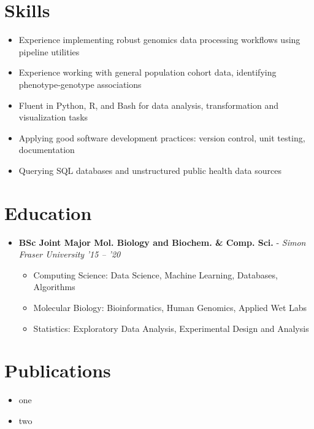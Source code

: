 \documentclass{article}
\newcommand{\experienceheader}[3]{\item \textbf{#1} - \textit{#2} \hfill \textit{#3} \vspace{-.2em}}
\newcommand{\customsection}[1]{\section*{#1} \vspace{-1em} \hrulefill \vspace{-.5em}}
\begin{document}
\customsection{Skills}
\begin{itemize}
  \item Experience implementing robust genomics data processing workflows using pipeline utilities
  \item Experience working with general population cohort data, identifying phenotype-genotype associations
  \item Fluent in Python, R, and Bash for data analysis, transformation and visualization tasks
  \item Applying good software development practices: version control, unit testing, documentation
  \item Querying SQL databases and unstructured public health data sources
\end{itemize}

\customsection{Education}
\begin{itemize}
\experienceheader{BSc Joint Major Mol. Biology and Biochem. \& Comp. Sci.}{Simon Fraser University}{'15 -- '20}
  \begin{itemize}
    \item Computing Science: Data Science, Machine Learning, Databases, Algorithms
    \item Molecular Biology: Bioinformatics, Human Genomics, Applied Wet Labs
    \item Statistics: Exploratory Data Analysis, Experimental Design and Analysis
  \end{itemize}
\end{itemize}

\customsection{Publications}
\begin{itemize}
  \item one
  \item two
\end{itemize}
\end{document}
